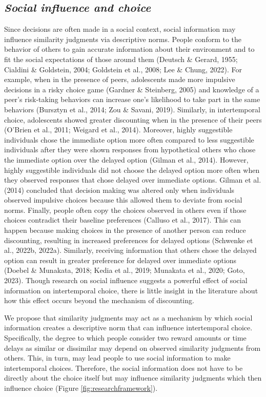 \documentclass[
  pub,floatsintext]{apa6}
\begin{document}
\hypertarget{social-influence-and-choice}{%
\subsection{\texorpdfstring{\emph{Social influence and choice}}{Social influence and choice}}\label{social-influence-and-choice}}

Since decisions are often made in a social context, social information may influence similarity judgments via descriptive norms. People conform to the behavior of others to gain accurate information about their environment and to fit the social expectations of those around them (Deutsch \& Gerard, 1955; Cialdini \& Goldstein, 2004; Goldstein et al., 2008; Lee \& Chung, 2022). For example, when in the presence of peers, adolescents made more impulsive decisions in a risky choice game (Gardner \& Steinberg, 2005) and knowledge of a peer's risk-taking behaviors can increase one's likelihood to take part in the same behaviors (Bursztyn et al., 2014; Zou \& Savani, 2019). Similarly, in intertemporal choice, adolescents showed greater discounting when in the presence of their peers (O'Brien et al., 2011; Weigard et al., 2014). Moreover, highly suggestible individuals chose the immediate option more often compared to less suggestible individuals after they were shown responses from hypothetical others who chose the immediate option over the delayed option (Gilman et al., 2014). However, highly suggestible individuals did not choose the delayed option more often when they observed responses that chose delayed over immediate options. Gilman et al. (2014) concluded that decision making was altered only when individuals observed impulsive choices because this allowed them to deviate from social norms. Finally, people often copy the choices observed in others even if those choices contradict their baseline preferences (Calluso et al., 2017). This can happen because making choices in the presence of another person can reduce discounting, resulting in increased preferences for delayed options (Schwenke et al., 2022b, 2022a). Similarly, receiving information that others chose the delayed option can result in greater preference for delayed over immediate options (Doebel \& Munakata, 2018; Kedia et al., 2019; Munakata et al., 2020; Goto, 2023). Though research on social influence suggests a powerful effect of social information on intertemporal choice, there is little insight in the literature about how this effect occurs beyond the mechanism of discounting.

We propose that similarity judgments may act as a mechanism by which social information creates a descriptive norm that can influence intertemporal choice. Specifically, the degree to which people consider two reward amounts or time delays as similar or dissimilar may depend on observed similarity judgments from others. This, in turn, may lead people to use social information to make intertemporal choices. Therefore, the social information does not have to be directly about the choice itself but may influence similarity judgments which then influence choice (Figure \ref{fig:researchframework}).
\end{document}
